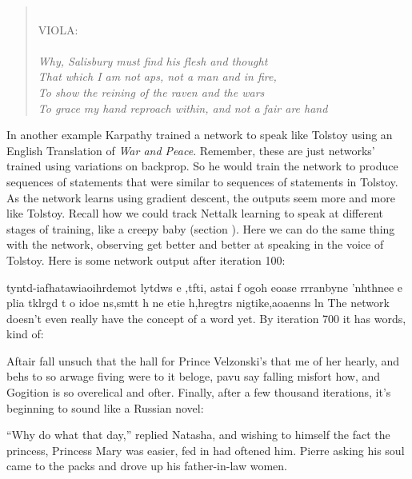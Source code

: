 \begin{quotation}
\hspace{5em} \\
VIOLA: \\ \\
\emph{Why, Salisbury must find his flesh and thought \\
That which I am not aps, not a man and in fire, \\
To show the reining of the raven and the wars \\
To grace my hand reproach within, and not a fair are hand}
\end{quotation}

In another example Karpathy trained a network to speak like Tolstoy using an English Translation of \emph{War and Peace}. Remember, these are just networks' trained using variations on backprop.  So he would train the network to produce sequences of statements that were similar to sequences of statements in Tolstoy. As the network learns using gradient descent, the outputs seem more and more like Tolstoy. Recall how we could track Nettalk learning to speak at different stages of training, like a creepy baby (section ). Here we can do the same thing with the network, observing get better and better at speaking in the voice of Tolstoy. Here is some network output after iteration 100:

\newenvironment{myquote}
  {\list{}{\leftmargin=0.3in\rightmargin=0.3in}\item[]}
  {\endlist}
\begin{myquote}
tyntd-iafhatawiaoihrdemot  lytdws  e ,tfti, astai f ogoh eoase rrranbyne 'nhthnee e 
plia tklrgd t o idoe ns,smtt   h ne etie h,hregtrs nigtike,aoaenns ln
\end{myquote}
The network doesn't even really have the concept of a word yet. By iteration 700 it has words, kind of:
\begin{myquote}
Aftair fall unsuch that the hall for Prince Velzonski's that me of
her hearly, and behs to so arwage fiving were to it beloge, pavu say falling misfort 
how, and Gogition is so overelical and ofter.
\end{myquote}
Finally, after a few thousand iterations, it's beginning to sound like a Russian novel:
\begin{myquote}
``Why do what that day,'' replied Natasha, and wishing to himself the fact the
princess, Princess Mary was easier, fed in had oftened him. Pierre asking his soul came to the packs and drove up his father-in-law women.
\end{myquote}

